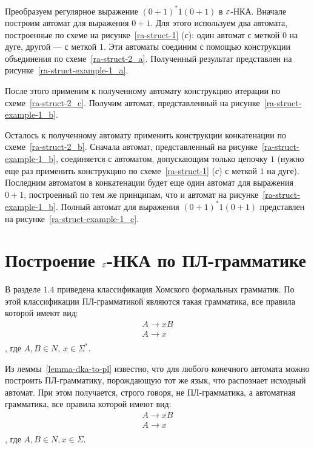 \begin{myexample}
Преобразуем регулярное выражение $(0 + 1)^*1(0 + 1)$ в $\varepsilon$-НКА. Вначале построим автомат для выражения $0 + 1$. Для этого используем два автомата, построенные по схеме на рисунке~\ref{ra-struct-1} (\textsl{с}): один автомат с меткой $0$ на дуге, другой --- с меткой $1$. Эти автоматы соединим с помощью конструкции объединения по схеме~\ref{ra-struct-2_a}. Полученный результат представлен на рисунке~\ref{ra-struct-example-1_a}. 

После этого применим к полученному автомату конструкцию итерации по схеме~\ref{ra-struct-2_c}. Получим автомат, представленный на рисунке~\ref{ra-struct-example-1_b}. 

Осталось к полученному автомату применить конструкции конкатенации по схеме~\ref{ra-struct-2_b}. Сначала автомат, представленный на рисунке~\ref{ra-struct-example-1_b}, соединяется с автоматом, допускающим только цепочку $1$ (нужно еще раз применить конструкцию по схеме~\ref{ra-struct-1} (\textsl{с}) с меткой $1$ на дуге). Последним автоматом в конкатенации будет еще один автомат для выражения $0 + 1$, построенный по тем же принципам, что и автомат на рисунке~\ref{ra-struct-example-1_b}.
Полный автомат для выражения $(0 + 1)^*1(0 + 1)$ представлен на рисунке~\ref{ra-struct-example-1_c}.

\end{myexample}

\section{Построение $\varepsilon$-НКА по ПЛ-грамматике}
\label{Chapter4GramtoFA}
В разделе $1.4$ приведена классификация Хомского формальных грамматик. По этой классификации ПЛ-грамматикой являются такая грамматика, все правила которой имеют вид:
\[
	\begin{array}{l}
	A \to xB \\
	A \to x \\
	\end{array}
\], где $A,B \in N$, $x\in\Sigma^*$.

Из леммы~\ref{lemma-dka-to-pl} известно, что для любого конечного автомата можно построить ПЛ-грамматику, порождающую тот же язык, что распознает исходный автомат. При этом получается, строго говоря, не ПЛ-грамматика, а автоматная грамматика, все правила которой имеют вид:
\[
 \begin{array}{l}
	A \to xB \\
	A \to x \\
	\end{array}
\], где $A,B \in N, x\in\Sigma$.

